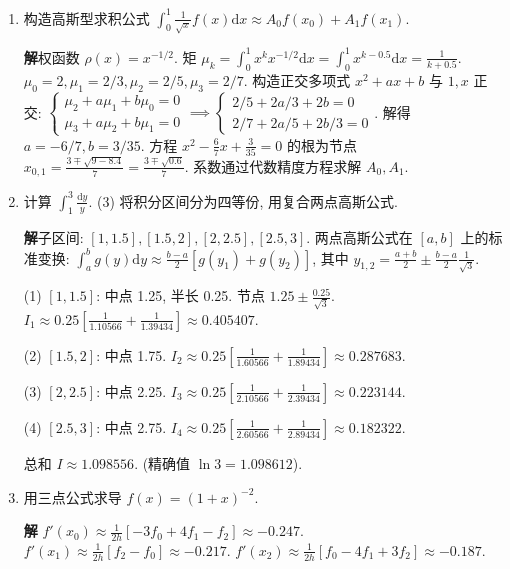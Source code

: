 \documentclass[a4paper,11pt]{ctexart}
\newcommand{\sol}{\par\noindent\textbf{解}\quad}
\newcommand{\ud}{\mathrm{d}}
\begin{document}
\begin{enumerate}[label=\textbf{4-\arabic*.}, leftmargin=*]
    \item[10.] 构造高斯型求积公式 $\int_0^1 \frac{1}{\sqrt{x}} f(x) \ud x \approx A_0 f(x_0) + A_1 f(x_1)$.
    
    \sol 权函数 $\rho(x) = x^{-1/2}$.
    矩 $\mu_k = \int_0^1 x^k x^{-1/2} \ud x = \int_0^1 x^{k-0.5} \ud x = \frac{1}{k+0.5}$.
    $\mu_0=2, \mu_1=2/3, \mu_2=2/5, \mu_3=2/7$.
    构造正交多项式 $x^2+ax+b$ 与 $1, x$ 正交:
    $\begin{cases} \mu_2 + a\mu_1 + b\mu_0 = 0 \\ \mu_3 + a\mu_2 + b\mu_1 = 0 \end{cases} \implies \begin{cases} 2/5 + 2a/3 + 2b = 0 \\ 2/7 + 2a/5 + 2b/3 = 0 \end{cases}$.
    解得 $a = -6/7, b = 3/35$.
    方程 $x^2 - \frac{6}{7}x + \frac{3}{35} = 0$ 的根为节点 $x_{0,1} = \frac{3 \mp \sqrt{9 - 8.4}}{7} = \frac{3 \mp \sqrt{0.6}}{7}$.
    系数通过代数精度方程求解 $A_0, A_1$.

    \item[14.] 计算 $\int_1^3 \frac{\ud y}{y}$. (3) 将积分区间分为四等份, 用复合两点高斯公式.
    
    \sol 子区间: $[1, 1.5], [1.5, 2], [2, 2.5], [2.5, 3]$.
    两点高斯公式在 $[a,b]$ 上的标准变换:
    $\int_a^b g(y)\ud y \approx \frac{b-a}{2} [g(y_1) + g(y_2)]$, 其中 $y_{1,2} = \frac{a+b}{2} \pm \frac{b-a}{2}\frac{1}{\sqrt{3}}$.
    
    (1) $[1, 1.5]$: 中点 1.25, 半长 0.25. 节点 $1.25 \pm \frac{0.25}{\sqrt{3}}$.
    $I_1 \approx 0.25 [\frac{1}{1.10566} + \frac{1}{1.39434}] \approx 0.405407$.
    
    (2) $[1.5, 2]$: 中点 1.75.
    $I_2 \approx 0.25 [\frac{1}{1.60566} + \frac{1}{1.89434}] \approx 0.287683$.
    
    (3) $[2, 2.5]$: 中点 2.25.
    $I_3 \approx 0.25 [\frac{1}{2.10566} + \frac{1}{2.39434}] \approx 0.223144$.
    
    (4) $[2.5, 3]$: 中点 2.75.
    $I_4 \approx 0.25 [\frac{1}{2.60566} + \frac{1}{2.89434}] \approx 0.182322$.
    
    总和 $I \approx 1.098556$. (精确值 $\ln 3 = 1.098612$).

    \item[18.] 用三点公式求导 $f(x) = (1+x)^{-2}$.
    \sol 
    $f'(x_0) \approx \frac{1}{2h}[-3f_0 + 4f_1 - f_2] \approx -0.247$.
    $f'(x_1) \approx \frac{1}{2h}[f_2 - f_0] \approx -0.217$.
    $f'(x_2) \approx \frac{1}{2h}[f_0 - 4f_1 + 3f_2] \approx -0.187$.
\end{enumerate}
\end{document}
